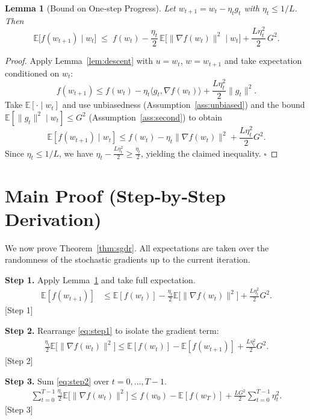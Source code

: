 \documentclass{article}
\newtheorem{lemma}{Lemma}
\newcommand{\E}{\mathbb{E}}
\begin{document}
\begin{lemma}[Bound on One‑step Progress]\label{lem:one-step}
Let $w_{t+1}=w_t-\eta_t g_t$ with $\eta_t\le 1/L$. Then
\[
\E\!\bigl[f(w_{t+1})\mid w_t\bigr]
\;\le\;
f(w_t)-\frac{\eta_t}{2}\,\E\!\bigl[\|\nabla f(w_t)\|^2\mid w_t\bigr]
+\frac{L\eta_t^2}{2}\,G^2 .
\]
\end{lemma}
\begin{proof}
Apply Lemma~\ref{lem:descent} with $u=w_t$, $w=w_{t+1}$ and take expectation conditioned on $w_t$:
\[
f(w_{t+1}) \le f(w_t)-\eta_t\langle g_t,\nabla f(w_t)\rangle+\frac{L\eta_t^2}{2}\|g_t\|^2 .
\]
Take $\E[\cdot\mid w_t]$ and use unbiasedness (Assumption~\ref{ass:unbiased}) and the bound $\E[\|g_t\|^2\mid w_t]\le G^2$ (Assumption~\ref{ass:second}) to obtain
\[
\E[f(w_{t+1})\mid w_t]\le f(w_t)-\eta_t\|\nabla f(w_t)\|^2+\frac{L\eta_t^2}{2}G^2 .
\]
Since $\eta_t\le 1/L$, we have $\eta_t-\frac{L\eta_t^2}{2}\ge\frac{\eta_t}{2}$, yielding the claimed inequality. \hfill $\square$
\end{proof}

\section*{Main Proof (Step‑by‑Step Derivation)}
We now prove Theorem~\ref{thm:sgdr}. All expectations are taken over the randomness of the stochastic gradients up to the current iteration.

\bigskip
\noindent\textbf{Step 1.} Apply Lemma~\ref{lem:one-step} and take full expectation.
\begin{align}
\E[f(w_{t+1})] 
&\le \E[f(w_t)] -\frac{\eta_t}{2}\E\bigl[\|\nabla f(w_t)\|^2\bigr] + \frac{L\eta_t^2}{2}G^2 .
\tag{2}\label{eq:step1}
\end{align}
[Step 1]

\bigskip
\noindent\textbf{Step 2.} Rearrange \eqref{eq:step1} to isolate the gradient term:
\begin{align}
\frac{\eta_t}{2}\E\bigl[\|\nabla f(w_t)\|^2\bigr]
\le 
\E[f(w_t)]-\E[f(w_{t+1})] + \frac{L\eta_t^2}{2}G^2 .
\tag{3}\label{eq:step2}
\end{align}
[Step 2]

\bigskip
\noindent\textbf{Step 3.} Sum \eqref{eq:step2} over $t=0,\dots,T-1$.
\begin{align}
\sum_{t=0}^{T-1}\frac{\eta_t}{2}\E\bigl[\|\nabla f(w_t)\|^2\bigr]
\le 
f(w_0)-\E[f(w_T)] + \frac{L G^2}{2}\sum_{t=0}^{T-1}\eta_t^2 .
\tag{4}\label{eq:step3}
\end{align}
[Step 3]
\end{document}
